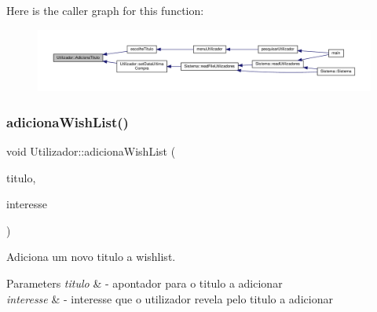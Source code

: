 Here is the caller graph for this function\+:
\nopagebreak
\begin{figure}[H]
\begin{center}
\leavevmode
\includegraphics[width=350pt]{classUtilizador_ac08a744b9d9d2aca0bd22c60e0beaa83_icgraph}
\end{center}
\end{figure}
\mbox{\label{classUtilizador_a45ee0a8d988adbd537e2506d80f96cfb}} 
\subsubsection{\texorpdfstring{adiciona\+Wish\+List()}{adicionaWishList()}}
{\footnotesize\ttfamily void Utilizador\+::adiciona\+Wish\+List (\begin{DoxyParamCaption}\item[{\hyperlink{classTitulo}{Titulo} $\ast$}]{titulo,  }\item[{unsigned}]{interesse }\end{DoxyParamCaption})}



Adiciona um novo titulo a wishlist. 


\begin{DoxyParams}{Parameters}
{\em titulo} & -\/ apontador para o titulo a adicionar \\
\hline
{\em interesse} & -\/ interesse que o utilizador revela pelo titulo a adicionar \\
\hline
\end{DoxyParams}

